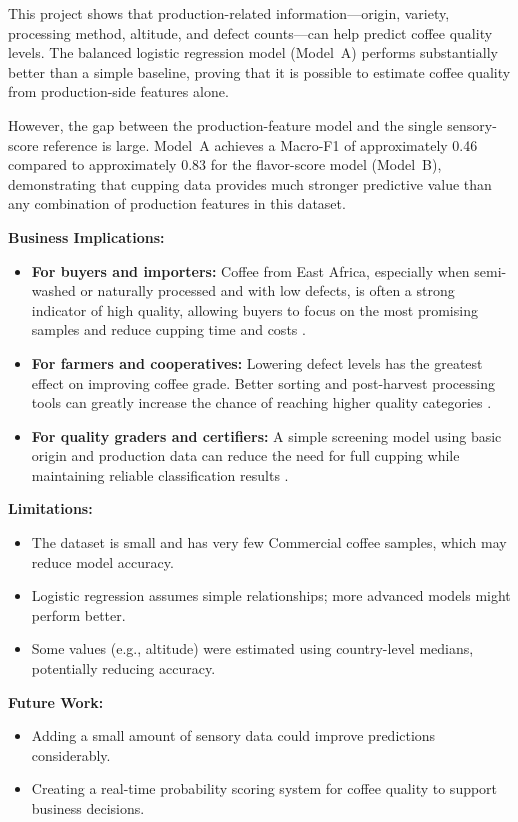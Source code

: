 \documentclass[12pt, a4paper]{article}
\begin{document}
This project shows that production-related information---origin, variety, processing method,
altitude, and defect counts---can help predict coffee quality levels. The balanced logistic
regression model (Model~A) performs substantially better than a simple baseline, proving that it
is possible to estimate coffee quality from production-side features alone.

However, the gap between the production-feature model and the single sensory-score reference is
large. Model~A achieves a Macro-F1 of approximately 0.46 compared to approximately 0.83 for the
flavor-score model (Model~B), demonstrating that cupping data provides much stronger predictive
value than any combination of production features in this dataset.

\textbf{Business Implications:}
\begin{itemize}
  \item \textbf{For buyers and importers:} Coffee from East Africa, especially when semi-washed
        or naturally processed and with low defects, is often a strong indicator of high quality,
        allowing buyers to focus on the most promising samples and reduce cupping time and costs
        \citep{IburuCoffee2021, EbruCoffee2025}.
  \item \textbf{For farmers and cooperatives:} Lowering defect levels has the greatest effect on
        improving coffee grade. Better sorting and post-harvest processing tools can greatly increase
        the chance of reaching higher quality categories \citep{SCA2005, WEF2020}.
  \item \textbf{For quality graders and certifiers:} A simple screening model using basic origin
        and production data can reduce the need for full cupping while maintaining reliable
        classification results \citep{PDG2024}.
\end{itemize}

\textbf{Limitations:}
\begin{itemize}
  \item The dataset is small and has very few Commercial coffee samples, which may reduce model
        accuracy.
  \item Logistic regression assumes simple relationships; more advanced models might perform better.
  \item Some values (e.g., altitude) were estimated using country-level medians, potentially
        reducing accuracy.
\end{itemize}

\textbf{Future Work:}
\begin{itemize}
  \item Adding a small amount of sensory data could improve predictions considerably.
  \item Creating a real-time probability scoring system for coffee quality to support business
        decisions.
\end{itemize}
\end{document}
